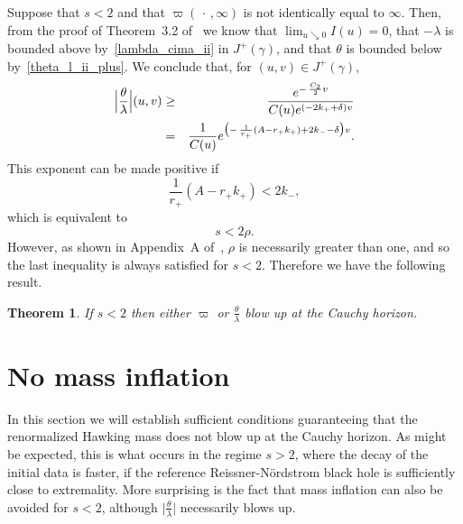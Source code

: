 \documentclass[a4paper,11pt,oneside,reqno]{amsart}
\newcommand{\s}{s}
\newcommand{\kk}{k_+}
\newcommand{\kkk}{k_-}
\newtheorem{Thm}{Theorem}[section]
\begin{document}
Suppose that $\s<2$ and that $\varpi(\,\cdot\,,\infty)$ is
not identically equal to $\infty$. Then, from the proof of Theorem~3.2 of~\cite{relIst3} we know
that $\lim_{u\searrow 0}I(u)=0$, that $-\lambda$ is bounded above by~\eqref{lambda_cima_ii}
in $J^+(\gamma)$, and that $\theta$ is bounded below by~\eqref{theta_l_ii_plus}.
We conclude that, for $(u,v)\in J^+(\gamma)$,
\begin{eqnarray}
\Bigl|\frac{\theta}{\lambda}\Bigr|(u,v)&\geq&
\frac{e^{-\,\frac{C_2}{2}v}}
{C(u)e^{(-2\kk+\delta)v}}
\nonumber\\
&=& \frac 1{C(u)}e^{\bigl(-\,\frac{1}{r_+}(A-r_+\kk)
+2\kkk-\delta\bigr)v}.\label{penelope}
\end{eqnarray}
This exponent can be made positive if
$$\textstyle
\frac{1}{r_+}(A-r_+\kk)<2\kkk,
$$
which is equivalent to 
$$
\s<2\rho.
$$
However, as shown in Appendix~A of~\cite{relIst3}, $\rho$ is necessarily greater than one,
and so the last inequality is always satisfied for $\s<2$. Therefore we have the following result.  

\begin{Thm}
If $\s<2$ then either $\varpi$ or $\frac{\theta}{\lambda}$ blow up at the Cauchy horizon.
\end{Thm}

\section{No mass inflation}\label{section10}

In this section we will establish sufficient conditions guaranteeing that the renormalized Hawking mass does not blow up at the Cauchy horizon. As might be expected, this is what occurs in the regime $\s > 2$, where the decay of the initial data is faster, if the reference Reissner-N\"ordstrom black hole is sufficiently close to extremality. More surprising is the fact that mass inflation can also be avoided for $\s < 2$, although $\bigl|\frac{\theta}{\lambda}\bigr|$ necessarily blows up.
\end{document}
